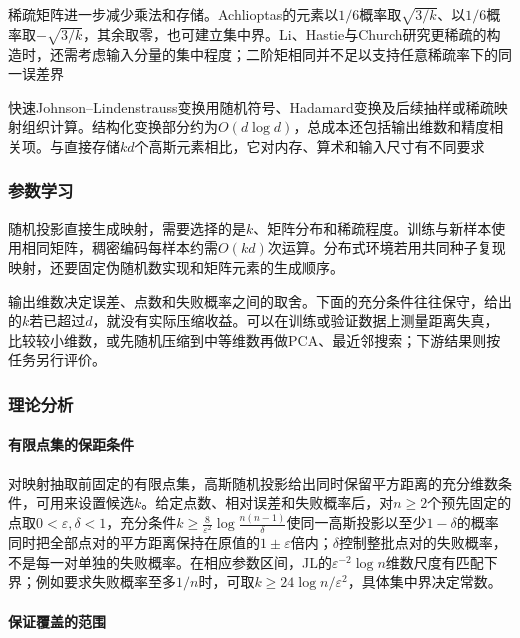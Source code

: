 稀疏矩阵进一步减少乘法和存储。Achlioptas的元素以$1/6$概率取$\sqrt{3/k}$、以$1/6$概率取$-\sqrt{3/k}$，其余取零，也可建立集中界。Li、Hastie与Church研究更稀疏的构造时，还需考虑输入分量的集中程度；二阶矩相同并不足以支持任意稀疏率下的同一误差界

快速Johnson--Lindenstrauss变换用随机符号、Hadamard变换及后续抽样或稀疏映射组织计算。结构化变换部分约为$O(d\log d)$，总成本还包括输出维数和精度相关项。与直接存储$kd$个高斯元素相比，它对内存、算术和输入尺寸有不同要求

\subsubsection{参数学习}
\label{sec:dim-rp-learning}

随机投影直接生成映射，需要选择的是$k$、矩阵分布和稀疏程度。训练与新样本使用相同矩阵，稠密编码每样本约需$O(kd)$次运算。分布式环境若用共同种子复现映射，还要固定伪随机数实现和矩阵元素的生成顺序。

输出维数决定误差、点数和失败概率之间的取舍。下面的充分条件往往保守，给出的$k$若已超过$d$，就没有实际压缩收益。可以在训练或验证数据上测量距离失真，比较较小维数，或先随机压缩到中等维数再做PCA、最近邻搜索；下游结果则按任务另行评价。

\subsubsection{理论分析}

\paragraph{有限点集的保距条件}

对映射抽取前固定的有限点集，高斯随机投影给出同时保留平方距离的充分维数条件，可用来设置候选$k$。给定点数、相对误差和失败概率后，对$n\geq2$个预先固定的点取$0<\varepsilon,\delta<1$，充分条件$k\geq\frac{8}{\varepsilon^2}\log\frac{n(n-1)}{\delta}$使同一高斯投影以至少$1-\delta$的概率同时把全部点对的平方距离保持在原值的$1\pm\varepsilon$倍内；$\delta$控制整批点对的失败概率，不是每一对单独的失败概率。在相应参数区间，JL的$\varepsilon^{-2}\log n$维数尺度有匹配下界；例如要求失败概率至多$1/n$时，可取$k\geq24\log n/\varepsilon^2$，具体集中界决定常数。

\paragraph{保证覆盖的范围}

